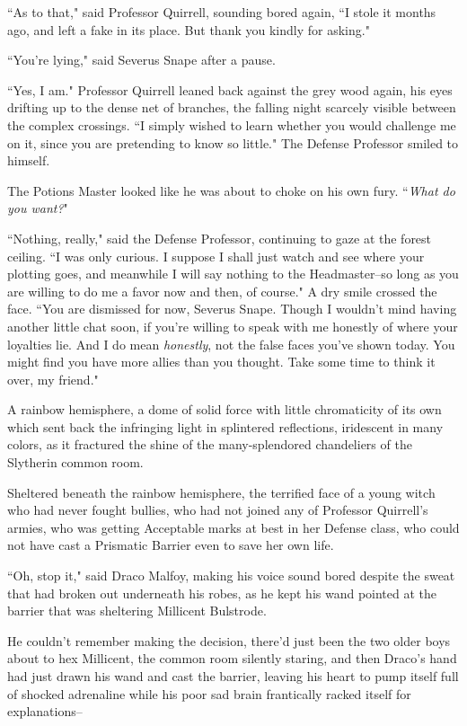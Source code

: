 ``As to that," said Professor Quirrell, sounding bored again, ``I stole it months ago, and left a fake in its place. But thank you kindly for asking."

``You're lying," said Severus Snape after a pause.

``Yes, I am." Professor Quirrell leaned back against the grey wood again, his eyes drifting up to the dense net of branches, the falling night scarcely visible between the complex crossings. ``I simply wished to learn whether you would challenge me on it, since you are pretending to know so little." The Defense Professor smiled to himself.

The Potions Master looked like he was about to choke on his own fury. ``\emph{What do you want?}"

``Nothing, really," said the Defense Professor, continuing to gaze at the forest ceiling. ``I was only curious. I suppose I shall just watch and see where your plotting goes, and meanwhile I will say nothing to the Headmaster\---so long as you are willing to do me a favor now and then, of course." A dry smile crossed the face. ``You are dismissed for now, Severus Snape. Though I wouldn't mind having another little chat soon, if you're willing to speak with me honestly of where your loyalties lie. And I do mean \emph{honestly}, not the false faces you've shown today. You might find you have more allies than you thought. Take some time to think it over, my friend."


A rainbow hemisphere, a dome of solid force with little chromaticity of its own which sent back the infringing light in splintered reflections, iridescent in many colors, as it fractured the shine of the many-splendored chandeliers of the Slytherin common room.

Sheltered beneath the rainbow hemisphere, the terrified face of a young witch who had never fought bullies, who had not joined any of Professor Quirrell's armies, who was getting Acceptable marks at best in her Defense class, who could not have cast a Prismatic Barrier even to save her own life.

``Oh, stop it," said Draco Malfoy, making his voice sound bored despite the sweat that had broken out underneath his robes, as he kept his wand pointed at the barrier that was sheltering Millicent Bulstrode.

He couldn't remember making the decision, there'd just been the two older boys about to hex Millicent, the common room silently staring, and then Draco's hand had just drawn his wand and cast the barrier, leaving his heart to pump itself full of shocked adrenaline while his poor sad brain frantically racked itself for explanations\---

